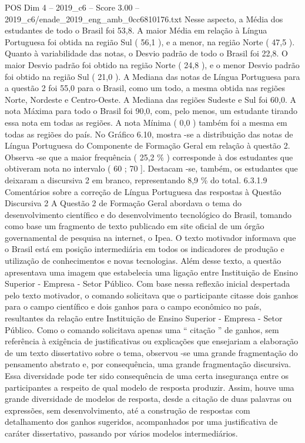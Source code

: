 \begin{textsample}{POS Dim 4 – 2019\_c6 – Score 3.00 – 2019\_c6/enade\_2019\_eng\_amb\_0cc6810176.txt}
Nesse aspecto, a Média dos estudantes de todo o Brasil foi 53,8.
A maior Média em relação à Língua Portuguesa foi obtida na região Sul ( 56,1 ), e a menor, na região Norte ( 47,5 ).
Quanto à variabilidade das notas, o Desvio padrão de todo o Brasil foi 22,8.
O maior Desvio padrão foi obtido na região Norte ( 24,8 ), e o menor Desvio padrão foi obtido na região Sul ( 21,0 ).
A Mediana das notas de Língua Portuguesa para a questão 2 foi 55,0 para o Brasil, como um todo, a mesma obtida nas regiões Norte, Nordeste e Centro-Oeste.
A Mediana das regiões Sudeste e Sul foi 60,0.
A nota Máxima para todo o Brasil foi 90,0, com, pelo menos, um estudante tirando essa nota em todas as regiões.
A nota Mínima ( 0,0 ) também foi a mesma em todas as regiões do país.
No Gráfico 6.10, mostra -se a distribuição das notas de Língua Portuguesa do Componente de Formação Geral em relação à questão 2.
Observa -se que a maior frequência ( 25,2 \% ) corresponde à dos estudantes que obtiveram nota no intervalo ( 60 ; 70 ].
Destacam -se, também, os estudantes que deixaram a discursiva 2 em branco, representando 8,9 \% do total. 6.3.1.9 Comentários sobre a correção de Língua Portuguesa das respostas à Questão Discursiva 2 A Questão 2 de Formação Geral abordava o tema do desenvolvimento científico e do desenvolvimento tecnológico do Brasil, tomando como base um fragmento de texto publicado em site oficial de um órgão governamental de pesquisa na internet, o Ipea.
O texto motivador informava que o Brasil está em posição intermediária em todos os indicadores de produção e utilização de conhecimentos e novas tecnologias.
Além desse texto, a questão apresentava uma imagem que estabelecia uma ligação entre Instituição de Ensino Superior - Empresa - Setor Público.
Com base nessa reflexão inicial despertada pelo texto motivador, o comando solicitava que o participante citasse dois ganhos para o campo científico e dois ganhos para o campo econômico no país, resultantes da relação entre Instituição de Ensino Superior - Empresa - Setor Público.
Como o comando solicitava apenas uma “ citação ” de ganhos, sem referência à exigência de justificativas ou explicações que ensejariam a elaboração de um texto dissertativo sobre o tema, observou -se uma grande fragmentação do pensamento abstrato e, por consequência, uma grande fragmentação discursiva.
Essa diversidade pode ter sido consequência de uma certa insegurança entre os participantes a respeito de qual modelo de resposta produzir.
Assim, houve uma grande diversidade de modelos de resposta, desde a citação de duas palavras ou expressões, sem desenvolvimento, até a construção de respostas com detalhamento dos ganhos sugeridos, acompanhados por uma justificativa de caráter dissertativo, passando por vários modelos intermediários.

\end{textsample}
